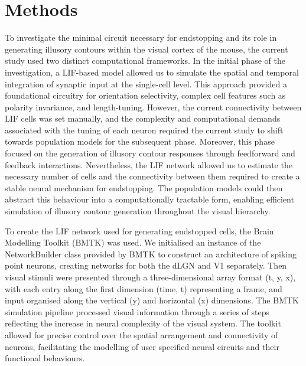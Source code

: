 \documentclass[12pt]{article}
\begin{document}
\section*{Methods}
\setlength{\parindent}{24pt}
To investigate the minimal circuit necessary for endstopping and its role in generating illusory contours within the visual cortex of the mouse, the current study used two distinct computational frameworks. In the initial phase of the investigation, a LIF-based model allowed us to simulate the spatial and temporal integration of synaptic input at the single-cell level. This approach provided a foundational circuitry for orientation selectivity, complex cell features such as polarity invariance, and length-tuning. However, the current connectivity between LIF cells was set manually, and the complexity and computational demands associated with the tuning of each neuron required the current study to shift towards population models for the subsequent phase. Moreover, this phase focused on the generation of illusory contour responses through feedforward and feedback interactions. Nevertheless, the LIF network allowed us to estimate the necessary number of cells and the connectivity between them required to create a stable neural mechanism for endstopping. The population models could then abstract this behaviour into a computationally tractable form, enabling efficient simulation of illusory contour generation throughout the visual hierarchy.
\setlength{\parindent}{0pt}


To create the LIF network used for generating endstopped cells, the Brain Modelling Toolkit (BMTK) was used. We initialised an instance of the NetworkBuilder class provided by BMTK to construct an architecture of spiking point neurons, creating networks for both the dLGN and V1 separately. Then visual stimuli were presented through a three-dimensional array format (t, y, x), with each entry along the first dimension (time, t) representing a frame, and input organised along the vertical (y) and horizontal (x) dimensions. The BMTK simulation pipeline processed visual information through a series of steps reflecting the increase in neural complexity of the visual system. The toolkit allowed for precise control over the spatial arrangement and connectivity of neurons, facilitating the modelling of user specified neural circuits and their functional behaviours.
\end{document}
